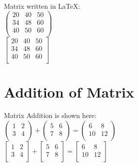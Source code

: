 \documentclass[12pt]{article}
\begin{document}
	\paragraph{}
	
	Matrix written in LaTeX: \\
	
	$
	\begin{pmatrix}
		20 & 40 & 50 \\
		34 & 48 & 60 \\
		40 & 50 & 60 \\
	\end{pmatrix}
	$	\\[12pt]
	
	$
	\begin{bmatrix}
		20 & 40 & 50 \\
		34 & 48 & 60 \\
		40 & 50 & 60 \\
	\end{bmatrix}
	$ \\[12pt]
	
	\section{Addition of Matrix}
	
	\paragraph{}
	
	Matrix Addition is shown here: \\
	
	$
	\begin{pmatrix}
		1 & 2 \\
		3 & 4 \\
	\end{pmatrix}
	+
	\begin{pmatrix}
		5 & 6 \\
		7 & 8 \\
	\end{pmatrix}
	=
	\begin{pmatrix}
		6 & 8 \\
		10 & 12 \\
	\end{pmatrix}
	$ \\[12pt]
	
	$
	\begin{bmatrix}
		1 & 2 \\
		3 & 4 \\
	\end{bmatrix}
	+
	\begin{bmatrix}
		5 & 6 \\
		7 & 8 \\
	\end{bmatrix}
	=
	\begin{bmatrix}
		6 & 8 \\
		10 & 12 \\
	\end{bmatrix}
	$
	
\end{document}
